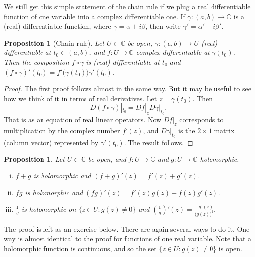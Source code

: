 \documentclass[12pt,openany]{book}
\newcommand{\C}{{\mathbb{C}}}
\theoremstyle{plain}
\newtheorem{prop}[thm]{Proposition}
\theoremstyle{remark}
\theoremstyle{definition}
\theoremstyle{exercise}
\theoremstyle{example}
\begin{document}
We still get this simple statement of the chain rule
if we plug a real differentiable function of one variable
into a complex differentiable
one.  If $\gamma \colon (a,b)
\to \C$ is a (real) differentiable function, where
$\gamma = \alpha + i \beta$,
then write $\gamma' = \alpha' + i \beta'$.

\begin{prop}[Chain rule]
%
\label{prop:chainrule2}%
Let $U \subset \C$ be open,
$\gamma \colon (a,b) \to U$ (real) differentiable at $t_0 \in (a,b)$,
and $f \colon U \to \C$ complex differentiable at $\gamma(t_0)$.
Then the composition $f \circ \gamma$ is (real) differentiable
at $t_0$ and $(f \circ \gamma)'(t_0) = f'\bigl(\gamma(t_0)\bigr) \gamma'(t_0)$.
\end{prop}

\begin{proof}
The first proof follows almost in the same way.  But it may be useful to see
how we think of it in terms of real derivatives.
Let $z = \gamma(t_0)$.  Then 
\begin{equation*}
D(f \circ \gamma)|_{t_0} =
Df|_z D\gamma|_{t_0} .
\end{equation*}
That is as an equation of real linear operators.  Now $Df|_z$ corresponds
to multiplication by the complex number $f'(z)$, and $D\gamma|_{t_0}$
is the $2 \times 1$ matrix (column vector) represented by $\gamma'(t_0)$.
The result follows.
\end{proof}

\begin{prop} \label{prop:sumproddiv}
Let $U \subset \C$ be open, and $f \colon U \to \C$ and
$g \colon U \to \C$ holomorphic.
\begin{enumerate}[(i)]
\item
$f+g$ is holomorphic and $(f+g)'(z) = f'(z) + g'(z)$.
\item
$fg$ is holomorphic and $(fg)'(z) = f'(z)g(z) + f(z)g'(z)$.
\item
$\frac{1}{g}$ is holomorphic on $\bigl\{ z \in U : g(z) \not= 0 \bigr\}$ and
${\left(\frac{1}{g}\right)}'(z) = \frac{-g'(z)}{{\bigl(g(z)\bigr)}^2}$.
\end{enumerate}
\end{prop}

The proof is left as an exercise below.  There are again several ways
to do it.  One way is almost identical to the
proof for functions of one real variable.
Note that
a holomorphic function is continuous, and so the set
$\bigl\{ z \in U : g(z) \not= 0 \bigr\}$ is open.
\end{document}
